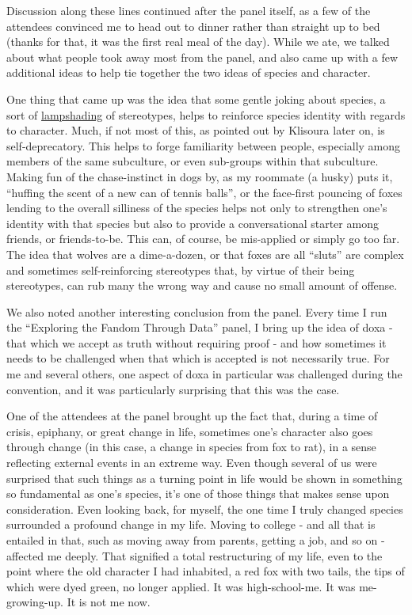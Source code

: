 Discussion along these lines continued after the panel itself, as a few
of the attendees convinced me to head out to dinner rather than straight
up to bed (thanks for that, it was the first real meal of the day).
While we ate, we talked about what people took away most from the panel,
and also came up with a few additional ideas to help tie together the
two ideas of species and character.

One thing that came up was the idea that some gentle joking about
species, a sort of
\href{http://tvtropes.org/pmwiki/pmwiki.php/Main/LampshadeHanging}{lampshading}
of stereotypes, helps to reinforce species identity with regards to
character. Much, if not most of this, as pointed out by Klisoura later
on, is self-deprecatory. This helps to forge familiarity between people,
especially among members of the same subculture, or even sub-groups
within that subculture. Making fun of the chase-instinct in dogs by, as
my roommate (a husky) puts it, ``huffing the scent of a new can of
tennis balls'', or the face-first pouncing of foxes lending to the
overall silliness of the species helps not only to strengthen one's
identity with that species but also to provide a conversational starter
among friends, or friends-to-be. This can, of course, be mis-applied or
simply go too far. The idea that wolves are a dime-a-dozen, or that
foxes are all ``sluts'' are complex and sometimes self-reinforcing
stereotypes that, by virtue of their being stereotypes, can rub many the
wrong way and cause no small amount of offense.

We also noted another interesting conclusion from the panel. Every time
I run the ``Exploring the Fandom Through Data'' panel, I bring up the
idea of doxa - that which we accept as truth without requiring proof -
and how sometimes it needs to be challenged when that which is accepted
is not necessarily true. For me and several others, one aspect of doxa
in particular was challenged during the convention, and it was
particularly surprising that this was the case.

One of the attendees at the panel brought up the fact that, during a
time of crisis, epiphany, or great change in life, sometimes one's
character also goes through change (in this case, a change in species
from fox to rat), in a sense reflecting external events in an extreme
way. Even though several of us were surprised that such things as a
turning point in life would be shown in something so fundamental as
one's species, it's one of those things that makes sense upon
consideration. Even looking back, for myself, the one time I truly
changed species surrounded a profound change in my life. Moving to
college - and all that is entailed in that, such as moving away from
parents, getting a job, and so on - affected me deeply. That signified a
total restructuring of my life, even to the point where the old
character I had inhabited, a red fox with two tails, the tips of which
were dyed green, no longer applied. It was high-school-me. It was
me-growing-up. It is not me now.

